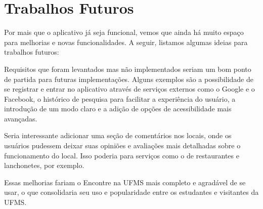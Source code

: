 \section{Trabalhos Futuros}

    Por mais que o aplicativo já seja funcional, vemos que ainda há muito espaço para melhorias e novas funcionalidades. A seguir, listamos algumas ideias para trabalhos futuros:
    
    Requisitos que foram levantados mas não implementados seriam um bom ponto de partida para futuras implementações. Alguns exemplos são a possibilidade de se registrar e entrar no aplicativo através de serviços externos como o Google e o Facebook, o histórico de pesquisa para facilitar a experiência do usuário, a introdução de um modo claro e a adição de opções de acessibilidade mais avançadas.
    
    Seria interessante adicionar uma seção de comentários nos locais, onde os usuários pudessem deixar suas opiniões e avaliações mais detalhadas sobre o funcionamento do local. Isso poderia para serviços como o de restaurantes e lanchonetes, por exemplo.

    Essas melhorias fariam o Encontre na UFMS mais completo e agradável de se usar, o que consolidaria seu uso e popularidade entre os estudantes e visitantes da UFMS.